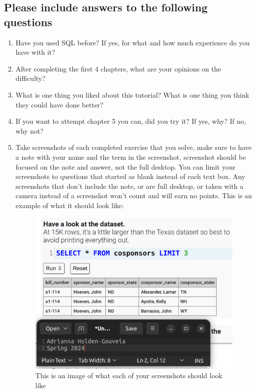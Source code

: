 \documentclass[12pt]{article}
\begin{document}
\subsection*{Please include answers to the following questions}
    \begin{enumerate}
        \item Have you used SQL before? If yes, for what and how much experience do you have with it?
        \item After completing the first 4 chapters, what are your opinions on the difficulty? 
        \item What is one thing you liked about this tutorial? What is one thing you think they could have done better?
        \item If you want to attempt chapter 5 you can, did you try it? If yes, why? If no, why not?
        \item Take screenshots of each completed exercise that you solve, make sure to have a note with your name and the term in the screenshot, screenshot should be focused on the note and answer, not the full desktop. You can limit your screenshots to questions that started as blank instead of each text box. Any screenshots that don't include the note, or are full desktop, or taken with a camera instead of a screenshot won't count and will earn no points. This is an example of what it should look like:        
 
        \begin{figure}[h!]
            \centerline{\includegraphics[scale=.2]{Examplewk6.png}}
            \caption{This is an image of what each of your screenshots should look like}

            \end{figure} 
    \end{enumerate}
\end{document}
